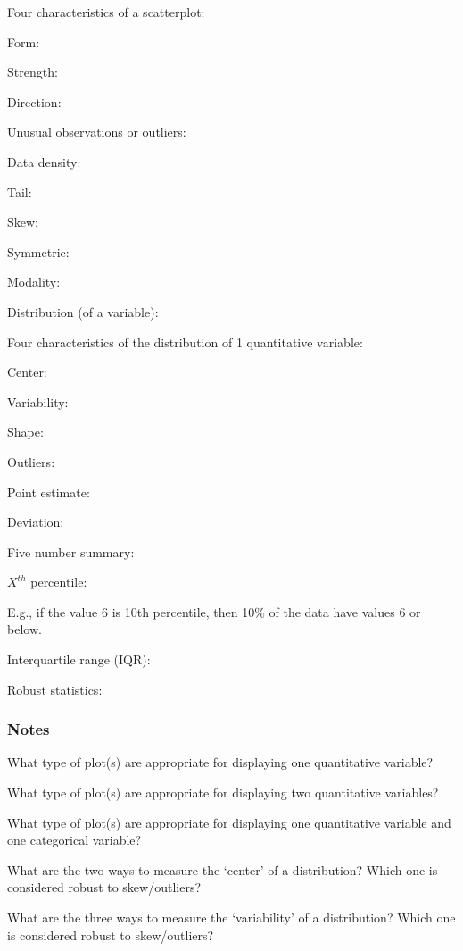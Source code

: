 \documentclass[
]{report}
\newcommand{\rgs}{\vspace{12pt}} %
\newcommand{\rgi}{\hspace{24pt}}  %
\begin{document}
Four characteristics of a scatterplot:

\rgi Form:
\rgs

\rgi Strength:
\rgs

\rgi Direction:
\rgs

\rgi Unusual observations or outliers:
\rgs

Data density:
\rgs

Tail:
\rgs

Skew:
\rgs

Symmetric:
\rgs

Modality:
\rgs

Distribution (of a variable):
\rgs

\rgi Four characteristics of the distribution of 1 quantitative variable:

\rgi Center:
\rgs

\rgi Variability:
\rgs

\rgi Shape:
\rgs

\rgi Outliers:
\rgs

Point estimate:
\rgs

Deviation:
\rgs

Five number summary:
\rgs

\(X^{th}\) percentile:
\rgs

\rgi E.g., if the value 6 is 10th percentile, then 10\% of the data have values 6 or below.

Interquartile range (IQR):
\rgs

Robust statistics:
\rgs

\hypertarget{notes-6}{%
\subsubsection*{Notes}\label{notes-6}}

What type of plot(s) are appropriate for displaying one quantitative variable?
\rgs

What type of plot(s) are appropriate for displaying two quantitative variables?
\rgs

What type of plot(s) are appropriate for displaying one quantitative variable and one categorical variable?
\rgs

What are the two ways to measure the `center' of a distribution? Which one is considered robust to skew/outliers?
\rgs

What are the three ways to measure the `variability' of a distribution? Which one is considered robust to skew/outliers?
\rgs
\end{document}
